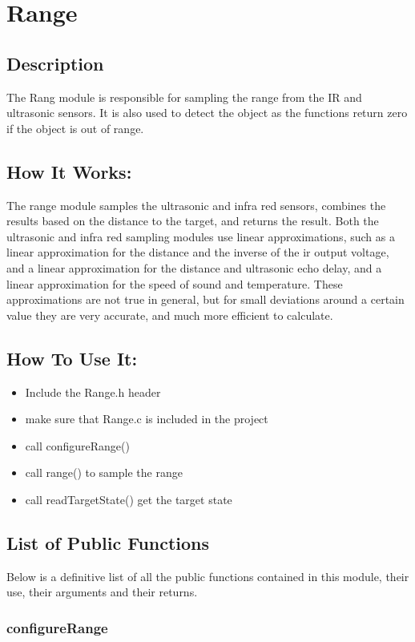 \documentclass[]{report}
\begin{document}
\chapter{Range}
\section{Description}
The Rang module is responsible for sampling the range from the IR and ultrasonic sensors. It is also used to detect the object as the functions return zero if the object is out of range.

\section{How It Works:}
The range module samples the ultrasonic and infra red sensors, combines the results based on the distance to the target, and returns the result. Both the ultrasonic and infra red sampling modules use linear approximations, such as a linear approximation for the distance and the inverse of the ir output voltage, and a linear approximation for the distance and ultrasonic echo delay, and a linear approximation for the speed of sound and temperature. These approximations are not true in general, but for small deviations around a certain value they are very accurate, and much more efficient to calculate.

\section{How To Use It:}
\begin{itemize}
	\item Include the Range.h header
	\item make sure that Range.c is included in the project
	\item call configureRange()
	\item call range() to sample the range
	\item call readTargetState() get the target state
\end{itemize}

\section{List of Public Functions}
Below is a definitive list of all the public functions contained in this module, their use, their arguments and their returns.

\subsection{configureRange}
\end{document}
